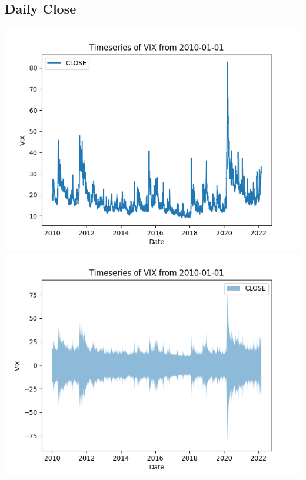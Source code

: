 \documentclass{article}
\begin{document}
\subsection{Daily Close}
\begin{center}
    \includegraphics{VIX_Close_Timeseries_2010}
    \includegraphics{VIX_Close_Timeseries_Fill_2010}
\end{center}
\end{document}
